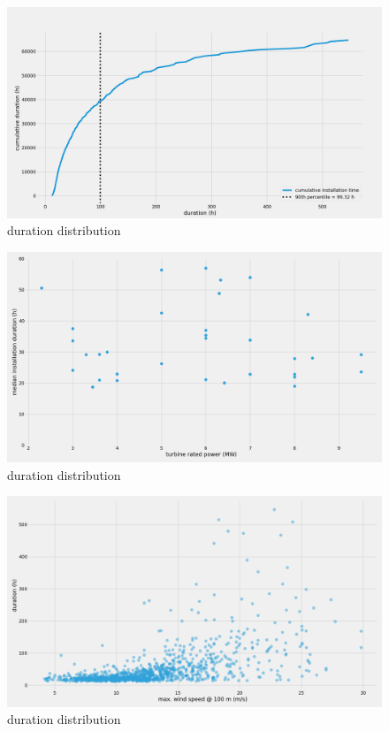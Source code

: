 \documentclass[wes, manuscript]{copernicus}
\begin{document}
\begin{figure}[h]
    \centering
    \includegraphics[width=\textwidth]{figures/cumulative_duration.png}
    \caption{duration distribution}
    \label{fig:cumsum}
\end{figure}

\begin{figure}[h]
    \centering
    \includegraphics[width=\textwidth]{figures/duration_turbine-size.png}
    \caption{duration distribution}
    \label{fig:size}
\end{figure}
\conclusions  %

\begin{figure}[h]
    \centering
    \includegraphics[width=\textwidth]{figures/duration_wind.png}
    \caption{duration distribution}
    \label{fig:wind}
\end{figure}
\end{document}
